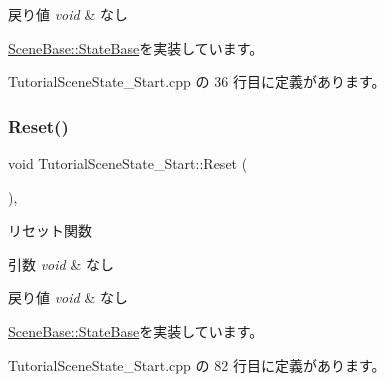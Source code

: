 \begin{DoxyRetVals}{戻り値}
{\em void} & なし \\
\hline
\end{DoxyRetVals}


\mbox{\hyperlink{class_scene_base_1_1_state_base_a33350231b039a2178c19beac0211c5b8}{Scene\+Base\+::\+State\+Base}}を実装しています。



 Tutorial\+Scene\+State\+\_\+\+Start.\+cpp の 36 行目に定義があります。

\mbox{\label{class_tutorial_scene_state___start_a40bfdf7acd93b619138bf708adff31e4}} 
\subsubsection{\texorpdfstring{Reset()}{Reset()}}
{\footnotesize\ttfamily void Tutorial\+Scene\+State\+\_\+\+Start\+::\+Reset (\begin{DoxyParamCaption}{ }\end{DoxyParamCaption})\hspace{0.3cm}{\ttfamily [override]}, {\ttfamily [virtual]}}



リセット関数 


\begin{DoxyParams}{引数}
{\em void} & なし \\
\hline
\end{DoxyParams}

\begin{DoxyRetVals}{戻り値}
{\em void} & なし \\
\hline
\end{DoxyRetVals}


\mbox{\hyperlink{class_scene_base_1_1_state_base_a2e14a3afece0b1d8db9edcebf514a977}{Scene\+Base\+::\+State\+Base}}を実装しています。



 Tutorial\+Scene\+State\+\_\+\+Start.\+cpp の 82 行目に定義があります。

\mbox{\label{class_tutorial_scene_state___start_a974962addfb0bcba90fbab64ac6d50f0}} 
